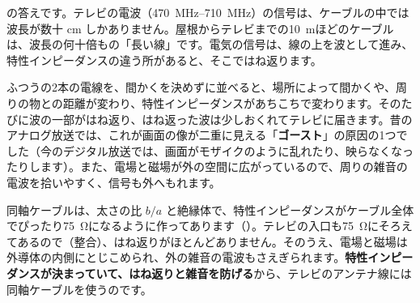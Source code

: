 \begin{bkfigure}
\label{ph:電-13:fig-teizai}
\end{bkfigure}

\label{ph:電-13:hatena}\bkhatenaref の答えです。テレビの電波（\qtyrange{470}{710}{MHz}）の信号は、ケーブルの中では波長が数十 cm しかありません。屋根からテレビまでの\qty{10}{m}ほどのケーブルは、波長の何十倍もの「長い線」です。電気の信号は、線の上を波として進み、特性インピーダンスの違う所があると、そこではね返ります。

ふつうの2本の電線を、間かくを決めずに並べると、場所によって間かくや、周りの物との距離が変わり、特性インピーダンスがあちこちで変わります。そのたびに波の一部がはね返り、はね返った波は少しおくれてテレビに届きます。昔のアナログ放送では、これが画面の像が二重に見える「\textbf{ゴースト}」の原因の1つでした（今のデジタル放送では、画面がモザイクのように乱れたり、映らなくなったりします）。また、電場と磁場が外の空間に広がっているので、周りの雑音の電波を拾いやすく、信号も外へもれます。

同軸ケーブルは、太さの比 $b/a$ と絶縁体で、特性インピーダンスがケーブル全体でぴったり\qty{75}{\ohm}になるように作ってあります（）。テレビの入口も\qty{75}{\ohm}にそろえてあるので（整合）、はね返りがほとんどありません。そのうえ、電場と磁場は外導体の内側にとじこめられ、外の雑音の電波もさえぎられます。\textbf{特性インピーダンスが決まっていて、はね返りと雑音を防げる}から、テレビのアンテナ線には同軸ケーブルを使うのです。

